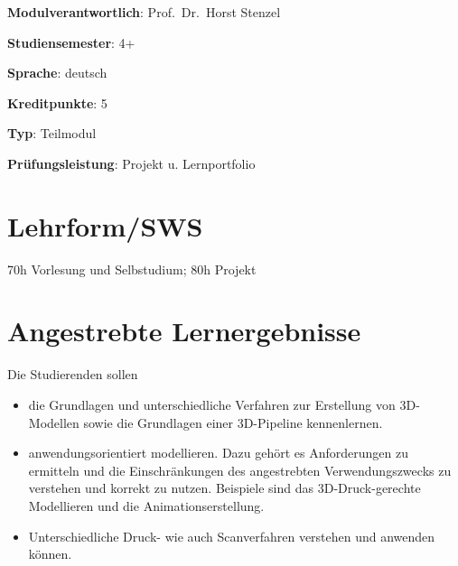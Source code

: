 \begin{modulHead}
\textbf{Modulverantwortlich}: Prof.~Dr.~Horst
Stenzel
\end{modulHead}
\begin{modulHead}
\textbf{Studiensemester}:
4+
\end{modulHead}
\begin{modulHead}
\textbf{Sprache}:
deutsch
\end{modulHead}
\begin{modulHead}
\textbf{Kreditpunkte}:
5
\end{modulHead}
\begin{modulHead}
\textbf{Typ}:
Teilmodul
\end{modulHead}
\begin{modulHead}
\textbf{Prüfungsleistung}:
Projekt u. Lernportfolio
\end{modulHead}


\hypertarget{lehrformswspathlabelmi-2017modulbeschreibungen-bachelorba_wpf-3d-msd}{%
\section*{Lehrform/SWS\label{/mi-2017/modulbeschreibungen-bachelor/BA_WPF-3D-MSD}}\label{lehrformswspathlabelmi-2017modulbeschreibungen-bachelorba_wpf-3d-msd}}

70h Vorlesung und Selbstudium; 80h Projekt

\hypertarget{angestrebte-lernergebnissepathlabelmi-2017modulbeschreibungen-bachelorba_wpf-3d-msd}{%
\section*{Angestrebte
Lernergebnisse\label{/mi-2017/modulbeschreibungen-bachelor/BA_WPF-3D-MSD}}\label{angestrebte-lernergebnissepathlabelmi-2017modulbeschreibungen-bachelorba_wpf-3d-msd}}

Die Studierenden sollen

\begin{itemize}
\tightlist
\item
  die Grundlagen und unterschiedliche Verfahren zur Erstellung von
  3D-Modellen sowie die Grundlagen einer 3D-Pipeline kennenlernen.
\item
  anwendungsorientiert modellieren. Dazu gehört es Anforderungen zu
  ermitteln und die Einschränkungen des angestrebten Verwendungszwecks
  zu verstehen und korrekt zu nutzen. Beispiele sind das
  3D-Druck-gerechte Modellieren und die Animationserstellung.
\item
  Unterschiedliche Druck- wie auch Scanverfahren verstehen und anwenden
  können.
\end{itemize}

